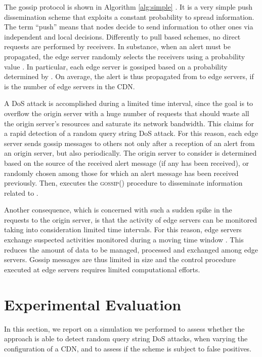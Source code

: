 \documentclass{IEEEtran}
\begin{document}
The gossip protocol is shown in Algorithm \ref{alg:simple} \cite{simutools}. It is a very simple push dissemination scheme that exploits a constant probability to spread information. The term ``push'' means that nodes decide to send information to other ones via independent and local decisions. Differently to pull based schemes, no direct requests are performed by receivers.
In substance, when an alert must be propagated, the edge server  randomly selects the receivers using a probability value . In particular, each edge server  is gossiped based on a probability determined by . On average, the alert is thus propagated from  to  edge servers, if  is the number of edge servers in the CDN.

A DoS attack is accomplished during a limited time interval, since the goal is to overflow the origin server with a huge number of requests that should waste all the origin server's resources and saturate its network bandwidth. This claims for a rapid detection of a random query string DoS attack. For this reason, each edge server sends gossip messages to others not only after a reception of an alert from an origin server, but also periodically. The origin server  to consider is determined based on the source of the received alert message (if any has been received), or randomly chosen among those for which an alert message has been received previously. Then,  executes the \textsc{gossip}() procedure to disseminate information related to . 

Another consequence, which is concerned with such a sudden spike in the requests to the origin server, is that the activity of edge servers can be monitored taking into consideration limited time intervals. For this reason, edge servers exchange suspected activities monitored during a moving time window . This reduces the amount of data to be managed, processed and exchanged among edge servers. Gossip messages are thus limited in size and the control procedure executed at edge servers requires limited computational efforts.


\section{Experimental Evaluation}
\label{sec:exp}

In this section, we report on a simulation we performed to assess whether the approach is able to detect random query string DoS attacks, when varying the configuration of a CDN, and to assess if the scheme is subject to false positives.
\end{document}
